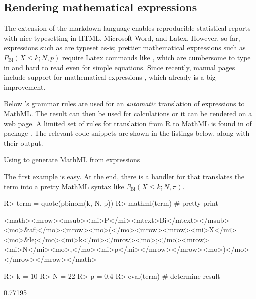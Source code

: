 \documentclass[article]{jss}
\begin{document}
\subsection{Rendering mathematical expressions}

The  extension of the markdown language \citep{Xie2020} enables
reproducible statistical reports with nice typesetting in HTML, Microsoft Word,
and Latex. However, so far,  expressions such 
as  are typeset as-is; prettier mathematical expressions
such as $P_\mathrm{Bi}(X \le k; N, p)$ require Latex commands 
like , which are
cumbersome to type in and hard to read even for simple equations. Since
recently, manual pages include support for mathematical 
expressions \citep{Sarkar2022}, which already is a big improvement.

Below 's grammar rules are used for an \emph{automatic}
translation of  expressions to MathML. The result can then be used
for calculations or it can be rendered on a web page. A limited set of rules for
translation from R to MathML is found in  of 
package . The relevant code snippets are shown in the listings below,
along with their output.

\begin{listing}

\begin{Schunk}
\end{Schunk}

\caption[Using rolog to generate MathML from R expressions]{Using  to generate MathML from  expressions}
\label{lst:mathml1}
\end{listing}

The first example is easy. At the  end, there is a handler 
for  that translates the term into a pretty MathML syntax
like $P_\mathrm{Bi}(X \le k; N, \pi)$.

\begin{Schunk}
\begin{Sinput}
R> term = quote(pbinom(k, N, p))
R> mathml(term)     # pretty print
\end{Sinput}
\begin{Soutput}
<math><mrow><msub><mi>P</mi><mtext>Bi</mtext></msub><mo>&af;</mo><mrow><mo>(</mo><mrow><mrow><mi>X</mi><mo>&le;</mo><mi>k</mi></mrow><mo>;</mo><mrow><mi>N</mi><mo>,</mo><mi>p</mi></mrow></mrow><mo>)</mo></mrow></mrow></math> 
\end{Soutput}
\begin{Sinput}
R> k = 10
R> N = 22
R> p = 0.4
R> eval(term)       # determine result
\end{Sinput}
\begin{Soutput}
[1] 0.77195
\end{Soutput}
\end{Schunk}
\end{document}
